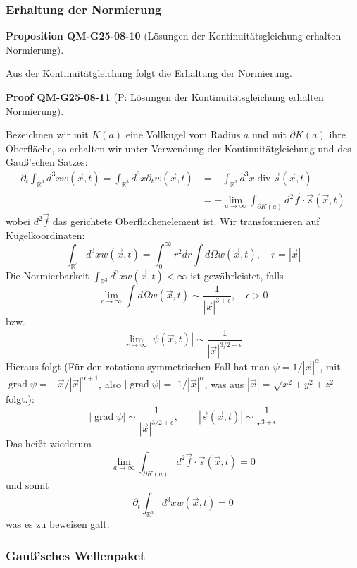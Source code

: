 \documentclass[10pt, letterpaper]{article}
\newcommand{\CustomHeading}[3]{%
  \par\medskip\noindent%
  \textbf{#1 #2} \textnormal{(#3)}.\enskip%
}
\newenvironment{PROP}[2]{\begin{unitbox}\CustomHeading{Proposition}{#1}{#2}}{\end{unitbox}}
\newenvironment{PROOF}[2]{\begin{unitbox}\CustomHeading{Proof}{#1}{#2}}{\end{unitbox}}
\begin{document}
\subsubsection*{Erhaltung der Normierung}


\begin{PROP}{QM-G25-08-10}{Lösungen der Kontinuitätsgleichung erhalten Normierung}
Aus der Kontinuitätgleichung folgt die Erhaltung der Normierung.
\end{PROP}


\begin{PROOF}{QM-G25-08-11}{P: Lösungen der Kontinuitätsgleichung erhalten Normierung}
Bezeichnen wir mit $K(a)$ eine Vollkugel vom Radius $a$ und mit $\partial K(a)$ ihre Oberfläche, so erhalten wir unter Verwendung der Kontinuitätgleichung und des Gauß'schen Satzes: 
$$
\begin{aligned}
\partial_{t} \int_{\mathbb{R}^{3}} d^{3} x w(\vec{x}, t)=\int_{\mathbb{R}^{3}} d^{3} x \partial_{t} w(\vec{x}, t) & =-\int_{\mathbb{R}^{3}} d^{3} x \operatorname{div} \vec{s}(\vec{x}, t) \\
& =-\lim _{a \rightarrow \infty} \int_{\partial K(a)} d^{2} \vec{f} \cdot \vec{s}(\vec{x}, t)
\end{aligned}
$$
wobei $d^{2} \vec{f}$ das gerichtete Oberflächenelement ist. Wir transformieren auf Kugelkoordinaten:
$$
\int_{\mathbb{R}^{3}} d^{3} x w(\vec{x}, t)=\int_{0}^{\infty} r^{2} d r \int d \Omega w(\vec{x}, t), \quad r=|\vec{x}|
$$
Die Normierbarkeit $\int_{\mathbb{R}^{3}} d^{3} x w(\vec{x}, t)<\infty$ ist gewährleistet, falls
$$
\lim _{r \rightarrow \infty} \int d \Omega w(\vec{x}, t) \sim \frac{1}{|\vec{x}|^{3+\epsilon}}, \quad \epsilon>0
$$
bzw.
$$
\lim _{r \rightarrow \infty}|\psi(\vec{x}, t)| \sim \frac{1}{|\vec{x}|^{3 / 2+\epsilon}}
$$
Hieraus folgt (Für den rotations-symmetrischen Fall hat man $\psi=1 /|\vec{x}|^\alpha$, mit $\operatorname{grad} \psi=-\vec{x} /|\vec{x}|^{\alpha+1}$, also $|\operatorname{grad} \psi|=$ $1 /|\vec{x}|^\alpha$, was aus $|\vec{x}|=\sqrt{x^2+y^2+z^2}$ folgt.):
$$
|\operatorname{grad} \psi| \sim \frac{1}{|\vec{x}|^{3 / 2+\epsilon}}, \quad \quad|\vec{s}(\vec{x}, t)| \sim \frac{1}{r^{3+\epsilon}}
$$
Das heißt wiederum
$$
\lim _{a \rightarrow \infty} \int_{\partial K(a)} d^{2} \vec{f} \cdot \vec{s}(\vec{x}, t)=0
$$
und somit
$$
\partial_{t} \int_{\mathbb{R}^{3}} d^{3} x w(\vec{x}, t)=0
$$
was es zu beweisen galt.
\end{PROOF}




\subsubsection*{Gauß'sches Wellenpaket}
\end{document}
